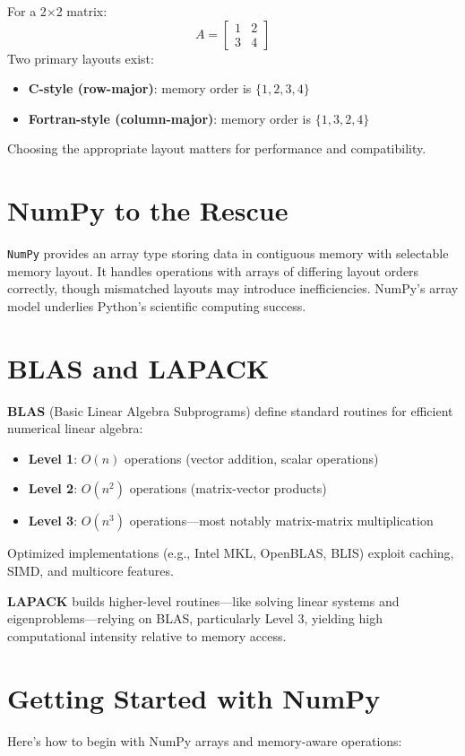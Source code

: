 \documentclass[11pt,a4paper]{book}
\begin{document}
For a 2×2 matrix:
\[
A = \begin{bmatrix}
1 & 2\\
3 & 4
\end{bmatrix}
\]
Two primary layouts exist:
\begin{itemize}
  \item \textbf{C-style (row-major)}: memory order is \(\{1,2,3,4\}\)
  \item \textbf{Fortran-style (column-major)}: memory order is \(\{1,3,2,4\}\)
\end{itemize}
Choosing the appropriate layout matters for performance and compatibility.

\section{NumPy to the Rescue}
\texttt{NumPy} provides an array type storing data in contiguous memory with selectable memory layout. It handles operations with arrays of differing layout orders correctly, though mismatched layouts may introduce inefficiencies. NumPy’s array model underlies Python's scientific computing success.

\section{BLAS and LAPACK}
\textbf{BLAS} (Basic Linear Algebra Subprograms) define standard routines for efficient numerical linear algebra:
\begin{itemize}
  \item \textbf{Level 1}: \(O(n)\) operations (vector addition, scalar operations)
  \item \textbf{Level 2}: \(O(n^2)\) operations (matrix-vector products)
  \item \textbf{Level 3}: \(O(n^3)\) operations—most notably matrix-matrix multiplication
\end{itemize}
Optimized implementations (e.g., Intel MKL, OpenBLAS, BLIS) exploit caching, SIMD, and multicore features.

\textbf{LAPACK} builds higher-level routines—like solving linear systems and eigenproblems—relying on BLAS, particularly Level 3, yielding high computational intensity relative to memory access.

\section{Getting Started with NumPy}
Here's how to begin with NumPy arrays and memory-aware operations:
\end{document}
